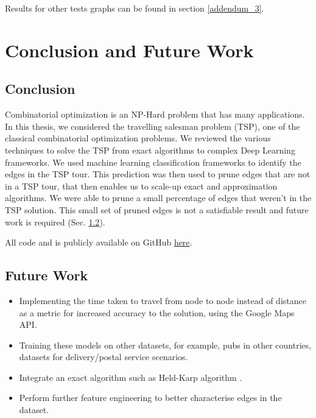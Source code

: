 \documentclass[]{UCD_CS_FYP_Report}
\begin{document}
Results for other tests graphs can be found in section \ref{addendum_3}.



\chapter{Conclusion and Future Work}
\section{Conclusion}
Combinatorial optimization is an NP-Hard problem that has many applications. In this thesis, we considered the travelling salesman problem (TSP), one of the classical combinatorial optimization problems. We reviewed the various techniques to solve the TSP from exact algorithms to complex Deep Learning frameworks. We used machine learning classification frameworks to identify the edges in the TSP tour. This prediction was then used to prune edges that are not in a TSP tour, that then enables us to scale-up exact and approximation algorithms. We were able to prune a small percentage of edges that weren't in the TSP solution. This small set of pruned edges is not a satisfiable result and future work is required (Sec. \ref{section: future work}).

All code and is publicly available on GitHub \href{https://github.com/SabeerBakir/Learning-shortest-path-tours-to-all-pubs-in-UK}{here}.


\section{Future Work}\label{section: future work}
\begin{itemize}
    \item Implementing the time taken to travel from node to node instead of distance as a metric for increased accuracy to the solution, using the Google Maps API.
    \item Training these models on other datasets, for example, pubs in other countries, datasets for delivery/postal service scenarios. 
    \item Integrate an exact algorithm such as Held-Karp algorithm \cite{Bellman:1962:DPT:321105.321111}.
    \item Perform further feature engineering to better characterise edges in the dataset.
\end{itemize}



%
\end{document}
